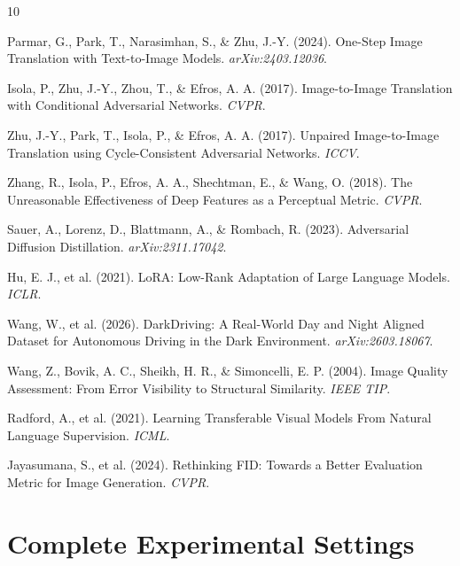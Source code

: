 \documentclass{article}
\begin{document}
\clearpage
\small
\begin{thebibliography}{10}

Parmar, G., Park, T., Narasimhan, S., \& Zhu, J.-Y. (2024). One-Step Image Translation with Text-to-Image Models. \textit{arXiv:2403.12036}.

Isola, P., Zhu, J.-Y., Zhou, T., \& Efros, A. A. (2017). Image-to-Image Translation with Conditional Adversarial Networks. \textit{CVPR}.

Zhu, J.-Y., Park, T., Isola, P., \& Efros, A. A. (2017). Unpaired Image-to-Image Translation using Cycle-Consistent Adversarial Networks. \textit{ICCV}.

Zhang, R., Isola, P., Efros, A. A., Shechtman, E., \& Wang, O. (2018). The Unreasonable Effectiveness of Deep Features as a Perceptual Metric. \textit{CVPR}.

Sauer, A., Lorenz, D., Blattmann, A., \& Rombach, R. (2023). Adversarial Diffusion Distillation. \textit{arXiv:2311.17042}.

Hu, E. J., et al. (2021). LoRA: Low-Rank Adaptation of Large Language Models. \textit{ICLR}.

Wang, W., et al. (2026). DarkDriving: A Real-World Day and Night Aligned Dataset for Autonomous Driving in the Dark Environment. \textit{arXiv:2603.18067}.

Wang, Z., Bovik, A. C., Sheikh, H. R., \& Simoncelli, E. P. (2004). Image Quality Assessment: From Error Visibility to Structural Similarity. \textit{IEEE TIP}.

Radford, A., et al. (2021). Learning Transferable Visual Models From Natural Language Supervision. \textit{ICML}.

Jayasumana, S., et al. (2024). Rethinking FID: Towards a Better Evaluation Metric for Image Generation. \textit{CVPR}.

\end{thebibliography}

\clearpage
\appendix
\normalsize

\section{Complete Experimental Settings}
\label{app:settings}
\end{document}
